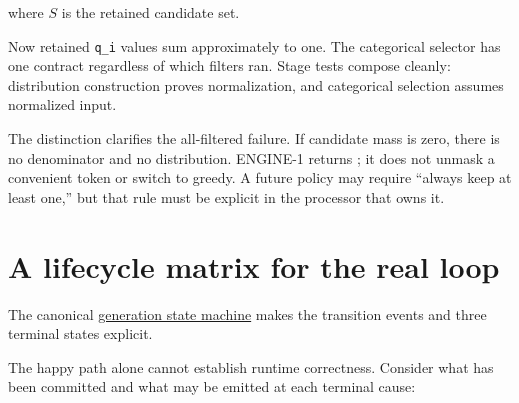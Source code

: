 where \(S\) is the retained candidate set.

Now retained \texttt{q\_i} values sum approximately to one. The
categorical selector has one contract regardless of which filters ran.
Stage tests compose cleanly: distribution construction proves
normalization, and categorical selection assumes normalized input.

The distinction clarifies the all-filtered failure. If candidate mass is
zero, there is no denominator and no distribution. ENGINE-1 returns
\texttt{}; it does not unmask a
convenient token or switch to greedy. A future policy may require
``always keep at least one,'' but that rule must be explicit in the
processor that owns it.

\section{A lifecycle matrix for the real
loop}\label{a-lifecycle-matrix-for-the-real-loop}

The canonical
\href{https://github.com/hermonai/inside-the-llm-engine/blob/astra-visual-rewrite/diagrams/sampling/generation-terminal-state-machine.txt}{generation
state machine} makes the transition events and three terminal states
explicit.

The happy path alone cannot establish runtime correctness. Consider what
has been committed and what may be emitted at each terminal cause:

